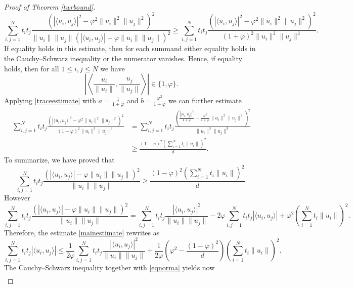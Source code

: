 \documentclass[12pt, reqno]{amsart}
\theoremstyle{definition}
\theoremstyle{remark}
\numberwithin{equation}{section}
\begin{document}
\begin{proof}[Proof of Theorem \ref{twrbound}]
$$
\sum_{i, j=1}^{N} t_it_j \frac{\left (|\langle u_i, u_j \rangle|^2 - \varphi^2 \|u_i\|^2 \|u_j\|^2 \right )^2}{\|u_i\| \|u_j\|\left (|\langle u_i, u_j \rangle| + \varphi  \|u_i\| \|u_j\| \right )^2} \geq \sum_{i, j=1}^{N} t_it_j \frac{\left (|\langle u_i, u_j \rangle|^2 - \varphi^2 \|u_i\|^2 \|u_j\|^2 \right )^2}{(1+\varphi)^2\|u_i\|^3\|u_j\|^3}.
$$
If equality holds in this estimate, then for each summand either equality holds in the Cauchy--Schwarz inequality or the numerator vanishes. Hence, if equality holds, then for all $1 \leq i, j \leq N$ we have
\begin{equation}
\label{condequi}
\left | \left \langle \frac{u_i}{\|u_i\|}, \frac{u_j}{\|u_j\|} \right \rangle \right | \in \{1, \varphi\}.
\end{equation}
Applying \eqref{traceestimate} with $a=\frac{1}{1+\varphi}$ and $b = \frac{\varphi^2}{1+\varphi}$ we can further estimate
\begin{align*}
\sum_{i, j=1}^{N} t_it_j \frac{\left (|\langle u_i, u_j \rangle|^2 - \varphi^2 \|u_i\|^2 \|u_j\|^2 \right )^2}{(1+\varphi)^2\|u_i\|^3\|u_j\|^3} &= \sum_{i, j=1}^{N} t_i t_j \frac{  \left (\frac{|\langle u_i, u_j \rangle|^2}{1+\varphi} - \frac{\varphi^2}{1+\varphi} \|u_i\|^2 \|u_j\|^2 \right )^2}{\|u_i\|^3\|u_j\|^3} \\ 
&\geq \frac{(1 - \varphi)^2 \left (  \sum_{i=1}^{N}  t_i \|u_i\|   \right )^2}{d}.
\end{align*}
To summarize, we have proved that
\begin{equation}
\label{mainestimate}
\sum_{i, j=1}^{N} t_i t_j \frac{\left (|\langle u_i, u_j \rangle| - \varphi \|u_i\| \|u_j\| \right )^2}{\|u_i\| \|u_j\|} \geq\frac{(1 - \varphi)^2 \left (  \sum_{i=1}^{N}  t_i \|u_i\|   \right )^2}{d}.
\end{equation}
However
$$\sum_{i, j=1}^{N} t_i t_j \frac{\left (|\langle u_i, u_j \rangle| - \varphi \|u_i\| \|u_j\| \right )^2}{\|u_i\| \|u_j\|}  =   \sum_{i, j = 1}^{N} t_i t_j \frac{|\langle u_i, u_j \rangle|^2}{\|u_i\| \|u_j\|} - 2 \varphi \sum_{i, j=1}^{N} t_i t_j |\langle u_i, u_j \rangle| + \varphi^2 \left ( \sum_{i=1}^{N} t_i \|u_i\| \right )^2.$$
Therefore, the estimate \eqref{mainestimate} rewrites as
$$\sum_{i, j=1}^{N} t_i t_j |\langle u_i, u_j \rangle| \leq \frac{1}{2\varphi} \sum_{i, j = 1}^{N} t_i t_j \frac{|\langle u_i, u_j \rangle|^2}{\|u_i\| \|u_j\|} + \frac{1}{2 \varphi} \left ( \varphi^2 - \frac{(1-\varphi)^2}{d} \right) \left ( \sum_{i=1}^{N} t_i \|u_i\| \right )^2.$$
The Cauchy--Schwarz inequality together with \eqref{eqnorma} yields now
\begin{align*}

\end{align*}
\end{proof}
\end{document}
